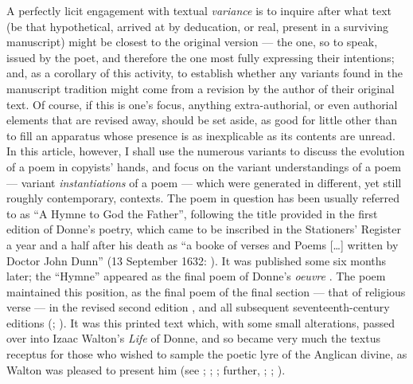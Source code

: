 \begin{paper}
A perfectly licit engagement with textual \emph{variance} is to inquire
after what text (be that hypothetical, arrived at by deducation, or real,
present in a surviving manuscript) might be closest to the original
version --- the one, so to speak, issued by the poet, and therefore the one
most fully expressing their intentions; and, as a corollary of this
activity, to establish whether any variants found in the manuscript
tradition might come from a revision by the author of their original
text. Of course, if this is one's focus, anything extra-authorial, or
even authorial elements that are revised away, should be set aside, as
good for little other than to fill an apparatus whose presence is as
inexplicable as its contents are unread. In this article, however, I
shall use the numerous variants to discuss the evolution of a poem in
copyists' hands, and focus on the variant understandings of a poem ---
variant \emph{instantiations} of a poem --- which were generated in different,
yet still roughly contemporary, contexts. The poem in question has been
usually referred to as ``A Hymne to God the Father'', following the
title provided in the first edition of Donne's poetry, which came to be
inscribed in the Stationers' Register a year and a half after his death
as ``a booke of verses and Poems {[}\ldots{}{]} written by Doctor John
Dunn'' (13 September 1632: \citealt[IV:249]{arber_transcript_1877}). It was published
some six months later; the ``Hymne'' appeared as the final poem of
Donne's \emph{oeuvre} \citep[350]{donne_poems_1633}. The poem maintained this
position, as the final poem of the final section --- that of religious
verse --- in the revised second edition \citep[350]{donne_poems_1635}, and all
subsequent seventeenth-century editions (\citeyear[388]{donne_poems_1639}; \citeyear[368]{donne_poems_1649,donne_poems_1650,donne_poems_1654}). It was this printed text which, with some small alterations,
passed over into Izaac Walton's \emph{Life} of Donne, and so became very
much the textus receptus for those who wished to sample the poetic lyre
of the Anglican divine, as Walton was pleased to present him (see \citealt{martin_izaak_2003}; \citealt{novarr_making_1958}; \citealt[116--17]{smith_john_1983}; further, \citealt{lambert_du_2012}; \citealt{cottegnies_autour_1999}; \citealt[11--13]{haskin_john_2007}).


\end{paper}
